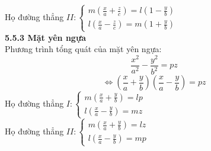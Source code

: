 \documentclass[12pt,a4]{article}
\begin{document}
\begin{titlepage}
Họ đường thẳng $II: \begin{cases} m(\frac{x}{a} + \frac{z}{c}) = l(1 - \frac{y}{b}) \\ l(\frac{x}{a} - \frac{z}{c}) = m(1 + \frac{y}{b})\end{cases}$\\
\vspace{0.2cm}
\textbf{5.5.3 Mặt yên ngựa}\\
\vspace{0.2cm}
Phương trình tổng quát của mặt yên ngựa:
\[
\frac{x^2}{a^2} - \frac{y^2}{b^2} = pz
\]
\[
\Leftrightarrow (\frac{x}{a} + \frac{y}{b})(\frac{x}{a} - \frac{y}{b}) = pz
\]
Họ đường thẳng $I: \begin{cases} m(\frac{x}{a} + \frac{y}{b}) = lp\\l(\frac{x}{a} - \frac{y}{b}) = mz\end{cases}$\\
Họ đường thẳng $II: \begin{cases} m(\frac{x}{a} + \frac{y}{b}) = lz\\l(\frac{x}{a} - \frac{y}{b}) = mp\end{cases}$
\vspace{0.2cm}

\end{titlepage}
\end{document}
